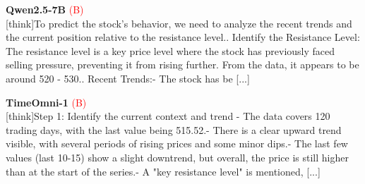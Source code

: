 \noindent
\begin{minipage}[t]{0.28\textwidth}
\colorbox{red!8}{\parbox{\dimexpr\textwidth-2\fboxsep}{
\textbf{Qwen2.5-7B} \textcolor{red}{(B)} \\[2pt]
\tiny
[think]\newline To predict the stock's behavior, we need to analyze the recent trends and the current position relative to the resistance level.. Identify the Resistance Level: The resistance level is a key price level where the stock has previously faced selling pressure, preventing it from rising further. From the data, it appears to be around 520 - 530.. Recent Trends:\newline    - The stock has be [...]
}}
\end{minipage}
\hfill
\begin{minipage}[t]{0.28\textwidth}
\colorbox{red!8}{\parbox{\dimexpr\textwidth-2\fboxsep}{
\textbf{TimeOmni-1} \textcolor{red}{(B)} \\[2pt]
\tiny
[think]\newline Step 1: Identify the current context and trend  \newline - The data covers 120 trading days, with the last value being 515.52.\newline - There is a clear upward trend visible, with several periods of rising prices and some minor dips.\newline - The last few values (last 10-15) show a slight downtrend, but overall, the price is still higher than at the start of the series.\newline - A "key resistance level" is mentioned,  [...]
}}
\end{minipage}
\hfill
